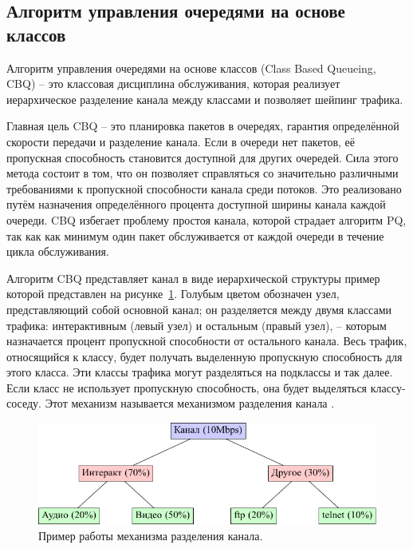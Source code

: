     \subsection{Алгоритм управления очередями на основе классов}

        Алгоритм управления очередями на основе классов (Class Based Queueing, CBQ) -- это
        классовая дисциплина обслуживания, которая реализует иерархическое
        разделение канала между классами и позволяет шейпинг трафика.\cite{tccbq}

        Главная цель CBQ -- это планировка пакетов в очередях, гарантия определённой
        скорости передачи и разделение канала. Если в очереди нет пакетов, её
        пропускная способность становится доступной для других очередей. Сила
        этого метода состоит в том, что он позволяет справляться со значительно
        различными требованиями к пропускной способности канала среди потоков. Это
        реализовано путём назначения определённого процента доступной ширины
        канала каждой очереди. CBQ избегает проблему простоя канала, которой страдает
        алгоритм PQ, так как как минимум один пакет обслуживается от каждой очереди
        в течение цикла обслуживания.\cite{packethandling}

		Алгоритм CBQ представляет канал в виде иерархической структуры \cite{linksharing}
		пример которой представлен на рисунке~\ref{pic:cbq}. Голубым цветом обозначен узел,
		представляющий собой основной канал; он разделяется между двумя классами трафика:
		интерактивным (левый узел) и остальным (правый узел), -- которым назначается процент
		пропускной способности от остального канала. Весь трафик, относящийся к классу,
		будет получать выделенную пропускную способность для этого класса. Эти
		классы трафика могут разделяться на подклассы и так далее. Если класс не использует
		пропускную способность, она будет выделяться классу-соседу. Этот механизм
		называется механизмом разделения канала \cite{linksharing}. 

        \begin{figure}[ht!]
			\center
            \includegraphics[scale=1.3]{./pdfimages/cbq.pdf}
            \caption{Пример работы механизма разделения канала.}
			\label{pic:cbq}
        \end{figure}

